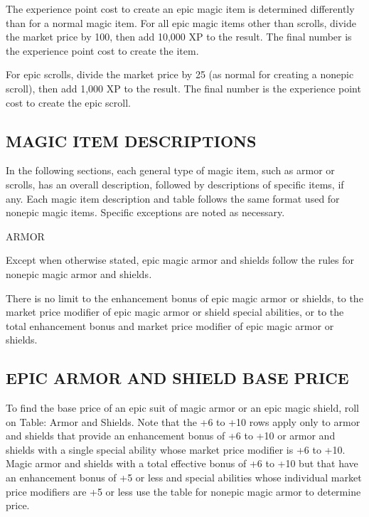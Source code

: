 \documentclass{article}
\begin{document}
The experience point cost to create an epic magic item is determined differently 
than for a normal magic item. For all epic magic items other than scrolls, divide 
the market price by 100, then add 10,000 XP to the result. The final number is 
the experience point cost to create the item. 

For epic scrolls, divide the market price by 25 (as normal for creating a nonepic 
scroll), then add 1,000 XP to the result. The final number is the experience point 
cost to create the epic scroll. 

\vspace{12pt}
\subsection*{MAGIC ITEM DESCRIPTIONS }

In the following sections, each general type of magic item, such as armor or scrolls, 
has an overall description, followed by descriptions of specific items, if any. 
Each magic item description and table follows the same format used for nonepic 
magic items\textit{. }Specific exceptions are noted as necessary. 

\vspace{12pt}
{\LARGE{}ARMOR }

Except when otherwise stated, epic magic armor and shields follow the rules for 
nonepic magic armor and shields\textit{.}

There is no limit to the enhancement bonus of epic magic armor or shields, to the 
market price modifier of epic magic armor or shield special abilities, or to the 
total enhancement bonus and market price modifier of epic magic armor or shields. 

\vspace{12pt}
\subsection*{EPIC ARMOR AND SHIELD BASE PRICE }

To find the base price of an epic suit of magic armor or an epic magic shield, 
roll on Table: Armor and Shields. Note that the +6 to +10 rows apply only to armor 
and shields that provide an enhancement bonus of +6 to +10 or armor and shields 
with a single special ability whose market price modifier is +6 to +10. Magic armor 
and shields with a total effective bonus of +6 to +10 but that have an enhancement 
bonus of +5 or less and special abilities whose individual market price modifiers 
are +5 or less use the table for nonepic magic armor\textit{ }to determine price. 
\end{document}
